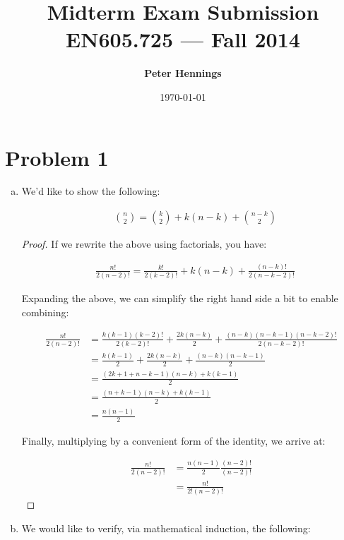 \documentclass[11pt]{article}
\title{\bf Midterm Exam Submission\\[2ex] 
       \rm\normalsize EN605.725 --- Fall 2014}
\date{\today}
\author{\bf Peter Hennings}
\begin{document}
\maketitle

\section*{Problem 1} 

\begin{enumerate}[(a)]

\item We'd like to show the following:

\begin{align*}
& {n \choose 2} = {k \choose 2} + k(n-k) + {n-k \choose 2}
\end{align*}

\begin{proof}

If we rewrite the above using factorials, you have:

\begin{align*}
& \frac{n!}{2(n-2)!} = \frac{k!}{2(k-2)!} + k(n-k) + \frac{(n-k)!}{2(n-k-2)!}
\end{align*}

Expanding the above, we can simplify the right hand side a bit to enable combining:

\begin{align*}
\frac{n!}{2(n-2)!} &= \frac{k(k-1)(k-2)!}{2(k-2)!} + \frac{2k(n-k)}{2} + \frac{(n-k)(n-k-1)(n-k-2)!}{2(n-k-2)!} \\
&= \frac{k(k-1)}{2} + \frac{2k(n-k)}{2} + \frac{(n-k)(n-k-1)}{2} \\
&= \frac{(2k+1+n-k-1)(n-k) + k(k-1)}{2} \\
&= \frac{(n+k-1)(n-k) + k(k-1)}{2} \\
&= \frac{n(n-1)}{2}
\end{align*}

Finally, multiplying by a convenient form of the identity, we arrive at:

\begin{align*}
\frac{n!}{2(n-2)!} &= \frac{n(n-1)}{2} \frac{(n-2)!}{(n-2)!} \\
&= \frac{n!}{2!(n-2)!}
\end{align*}

\end{proof}

\item We would like to verify, via mathematical induction, the following:


\end{enumerate}
\end{document}
